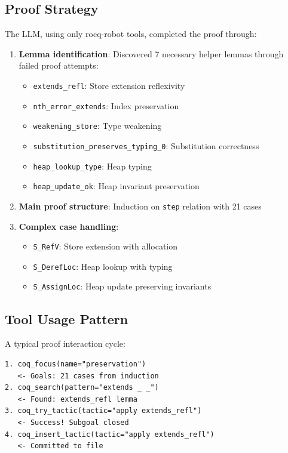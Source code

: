\documentclass[sigconf,screen,nonacm]{acmart}
\begin{document}
\subsection{Proof Strategy}

The LLM, using only rocq-robot tools, completed the proof through:

\begin{enumerate}
\item \textbf{Lemma identification}: Discovered 7 necessary helper lemmas through failed proof attempts:
  \begin{itemize}
  \item \texttt{extends\_refl}: Store extension reflexivity
  \item \texttt{nth\_error\_extends}: Index preservation
  \item \texttt{weakening\_store}: Type weakening
  \item \texttt{substitution\_preserves\_typing\_0}: Substitution correctness
  \item \texttt{heap\_lookup\_type}: Heap typing
  \item \texttt{heap\_update\_ok}: Heap invariant preservation
  \end{itemize}

\item \textbf{Main proof structure}: Induction on \texttt{step} relation with 21 cases

\item \textbf{Complex case handling}:
  \begin{itemize}
  \item \texttt{S\_RefV}: Store extension with allocation
  \item \texttt{S\_DerefLoc}: Heap lookup with typing
  \item \texttt{S\_AssignLoc}: Heap update preserving invariants
  \end{itemize}
\end{enumerate}

\subsection{Tool Usage Pattern}

A typical proof interaction cycle:

\begin{lstlisting}[basicstyle=\small\ttfamily]
1. coq_focus(name="preservation")
   <- Goals: 21 cases from induction
2. coq_search(pattern="extends _ _")
   <- Found: extends_refl lemma
3. coq_try_tactic(tactic="apply extends_refl")
   <- Success! Subgoal closed
4. coq_insert_tactic(tactic="apply extends_refl")
   <- Committed to file
\end{lstlisting}
\end{document}

